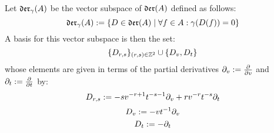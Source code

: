         \begin{lemma} \label{lemma: yangian_div_zero_vector_fields_basis}
            Let $\mathfrak{der}_{\gamma}(A)$ be the vector subspace of $\mathfrak{der}(A)$ defined as follows:
                $$\mathfrak{der}_{\gamma}(A) := \{ D \in \mathfrak{der}(A) \mid \forall f \in A: \gamma(D(f)) = 0 \}$$
            A basis for this vector subspace is then the set:
                $$\{D_{r, s}\}_{(r, s) \in \mathbb{Z}^2} \cup \{D_v, D_t\}$$
            whose elements are given in terms of the partial derivatives $\partial_v := \frac{\partial}{\partial v}$ and $\partial_t := \frac{\partial}{\partial t}$ by:
                $$D_{r, s} := -s v^{-r + 1} t^{-s - 1} \partial_v + r v^{-r} t^{-s} \partial_t$$
                $$D_v := -v t^{-1} \partial_v$$
                $$D_t := -\partial_t$$
        \end{lemma}
